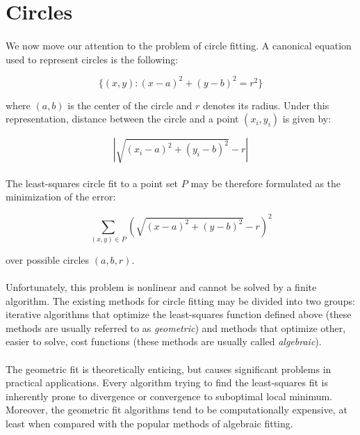 \section{Circles}

\paragraph*{}
We now move our attention to the problem of circle fitting. A canonical equation used to represent circles is the following:

\[
	\{(x,y): (x-a)^2 + (y-b)^2 = r^2\}
\]

where $(a,b)$ is the center of the circle and $r$ denotes its radius. Under this representation, distance between the circle and a point $(x_i, y_i)$ is given by:

\[
	|\sqrt{(x_i-a)^2 + (y_i-b)^2} - r|
\]

\paragraph*{}
The least-squares circle fit to a point set $P$ may be therefore formulated as the minimization of the error:

\[
	\sum_{(x,y) \in P} (\sqrt{(x-a)^2 + (y-b)^2} - r)^2
\]

over possible circles $(a,b,r)$.


\paragraph*{}
Unfortunately, this problem is nonlinear and cannot be solved by a finite algorithm. The existing methods for circle fitting may be divided into two groups: iterative algorithms that optimize the least-squares function defined above (these methods are usually referred to as \textit{geometric}) and methods that optimize other, easier to solve, cost functions (these methods are usually called \textit{algebraic}).

\paragraph*{}
The geometric fit is theoretically enticing, but causes significant problems in practical applications. Every algorithm trying to find the least-squares fit is inherently prone to divergence or convergence to suboptimal local minimum. Moreover, the geometric fit algorithms tend to be computationally expensive, at least when compared with the popular methods of algebraic fitting.

